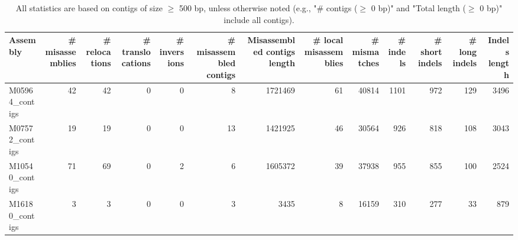 \documentclass[12pt,a4paper]{article}
\begin{document}
\begin{table}[ht]
\begin{center}
\caption{All statistics are based on contigs of size $\geq$ 500 bp, unless otherwise noted (e.g., "\# contigs ($\geq$ 0 bp)" and "Total length ($\geq$ 0 bp)" include all contigs).}
\begin{tabular}{|l*{12}{|r}|}
\hline
Assembly & \# misassemblies &     \# relocations &     \# translocations &     \# inversions & \# misassembled contigs & Misassembled contigs length & \# local misassemblies & \# mismatches & \# indels &     \# short indels &     \# long indels & Indels length \\ \hline
M05964\_contigs & 42 & 42 & 0 & 0 & 8 & 1721469 & 61 & 40814 & 1101 & 972 & 129 & 3496 \\ \hline
M07572\_contigs & 19 & 19 & 0 & 0 & 13 & 1421925 & 46 & 30564 & 926 & 818 & 108 & 3043 \\ \hline
M10540\_contigs & 71 & 69 & 0 & 2 & 6 & 1605372 & 39 & 37938 & 955 & 855 & 100 & 2524 \\ \hline
M16180\_contigs & 3 & 3 & 0 & 0 & 3 & 3435 & 8 & 16159 & 310 & 277 & 33 & 879 \\ \hline
\end{tabular}
\end{center}
\end{table}
\end{document}

